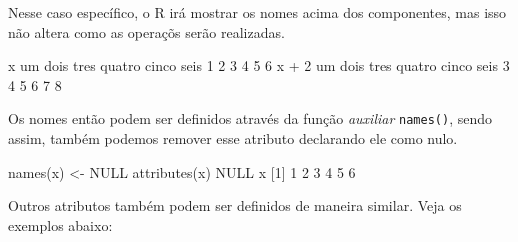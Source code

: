 \documentclass[
  10pt,
  a4paper]{book}
\newenvironment{Shaded}{\begin{snugshade}}{\end{snugshade}}
\newcommand{\ConstantTok}[1]{\textcolor[rgb]{0.00,0.00,0.00}{#1}}
\newcommand{\DecValTok}[1]{\textcolor[rgb]{0.00,0.00,0.81}{#1}}
\newcommand{\FunctionTok}[1]{\textcolor[rgb]{0.00,0.00,0.00}{#1}}
\newcommand{\NormalTok}[1]{#1}
\newcommand{\OtherTok}[1]{\textcolor[rgb]{0.56,0.35,0.01}{#1}}
\newcommand{\SpecialCharTok}[1]{\textcolor[rgb]{0.00,0.00,0.00}{#1}}
\begin{document}
Nesse caso específico, o R irá mostrar os nomes acima dos componentes,
mas isso não altera como as operaçõs serão realizadas.

\begin{Shaded}
\begin{Highlighting}[]
\NormalTok{x}
\NormalTok{    um   dois   tres quatro  cinco   seis }
     \DecValTok{1}      \DecValTok{2}      \DecValTok{3}      \DecValTok{4}      \DecValTok{5}      \DecValTok{6} 
\NormalTok{x }\SpecialCharTok{+} \DecValTok{2}
\NormalTok{    um   dois   tres quatro  cinco   seis }
     \DecValTok{3}      \DecValTok{4}      \DecValTok{5}      \DecValTok{6}      \DecValTok{7}      \DecValTok{8} 
\end{Highlighting}
\end{Shaded}

Os nomes então podem ser definidos através da função \emph{auxiliar}
\texttt{names()}, sendo assim, também podemos remover esse atributo declarando
ele como nulo.

\begin{Shaded}
\begin{Highlighting}[]
\FunctionTok{names}\NormalTok{(x) }\OtherTok{\textless{}{-}} \ConstantTok{NULL}
\FunctionTok{attributes}\NormalTok{(x)}
\ConstantTok{NULL}
\NormalTok{x}
\NormalTok{[}\DecValTok{1}\NormalTok{] }\DecValTok{1} \DecValTok{2} \DecValTok{3} \DecValTok{4} \DecValTok{5} \DecValTok{6}
\end{Highlighting}
\end{Shaded}

Outros atributos também podem ser definidos de maneira similar.
Veja os exemplos abaixo:
\end{document}
